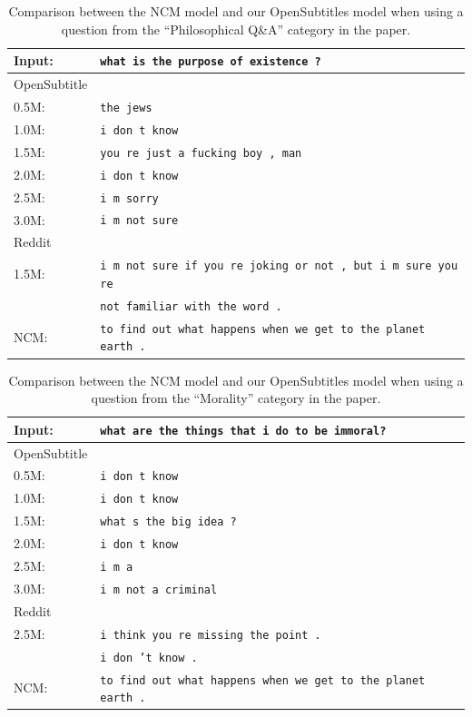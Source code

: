 \begin{table}[H]
	\centering
	\begin{adjustbox}{max width=\textwidth}
		\begin{tabular}{ll}
			\toprule
			Input: 	& \texttt{what is the purpose of existence ?}\\
			\midrule
			OpenSubtitle\\
			0.5M: 	& \texttt{the jews}\\
			1.0M: 	& \texttt{i don t know}\\
			1.5M:	& \texttt{you re just a fucking boy , man}\\
			2.0M:	& \texttt{i don t know}\\
			2.5M:	& \texttt{i m sorry}\\
			3.0M:	& \texttt{i m not sure}\\
			\midrule
			Reddit\\
			1.5M:	& \texttt{i m not sure if you re joking or not , but i m sure you re }\\
			& \texttt{not familiar with the word .}\\
			\midrule
			NCM:	& \texttt{to find out what happens when we get to the planet earth .}\\
			\bottomrule
		\end{tabular}
	\end{adjustbox}
	\caption{Comparison between the NCM model and our OpenSubtitles model when using a question from the ``Philosophical Q\&A'' category in the paper.}
	\label{results:example13_output:Neural_Conversational_Model_compared}
\end{table}
\begin{table}[H]
	\centering
	\begin{adjustbox}{max width=\textwidth}
		\begin{tabular}{ll}
			\toprule
			Input: 	& \texttt{what are the things that i do to be immoral?}\\
			\midrule
			OpenSubtitle\\
			0.5M: 	& \texttt{i don t know}\\
			1.0M: 	& \texttt{i don t know}\\
			1.5M:	& \texttt{what s the big idea ?}\\
			2.0M:	& \texttt{i don t know}\\
			2.5M:	& \texttt{i m a}\\
			3.0M:	& \texttt{i m not a criminal}\\
			\midrule
			Reddit\\
			2.5M:	& \texttt{i think you re missing the point .}\\
			& \texttt{i don ’t know .}\\
			\midrule
			NCM:	& \texttt{to find out what happens when we get to the planet earth .}\\
			\bottomrule
		\end{tabular}
	\end{adjustbox}
	\caption{Comparison between the NCM model and our OpenSubtitles model when using a question from the ``Morality'' category in the paper.}
	\label{results:example14_output:Neural_Conversational_Model_compared}
\end{table}

